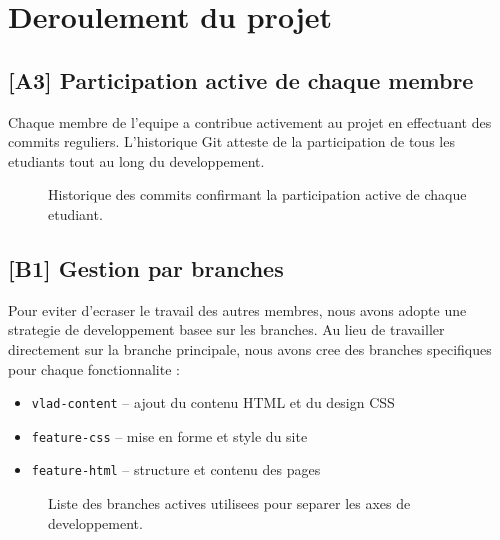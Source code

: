 \documentclass[12pt,a4paper]{article}
\begin{document}
\section{Deroulement du projet}

\subsection*{[A3] Participation active de chaque membre}

Chaque membre de l'equipe a contribue activement au projet en effectuant des commits reguliers. L'historique Git atteste de la participation de tous les etudiants tout au long du developpement.

\begin{figure}[h]
    \centering
    \caption{Historique des commits confirmant la participation active de chaque etudiant.}
\end{figure}

\newpage

\subsection*{[B1] Gestion par branches}

Pour eviter d'ecraser le travail des autres membres, nous avons adopte une strategie de developpement basee sur les branches. Au lieu de travailler directement sur la branche principale, nous avons cree des branches specifiques pour chaque fonctionnalite :

\begin{itemize}[leftmargin=2cm]
    \item \texttt{vlad-content} -- ajout du contenu HTML et du design CSS
    \item \texttt{feature-css} -- mise en forme et style du site
    \item \texttt{feature-html} -- structure et contenu des pages
\end{itemize}

\begin{figure}[h]
    \centering
    \caption{Liste des branches actives utilisees pour separer les axes de developpement.}
\end{figure}

\newpage
\end{document}
